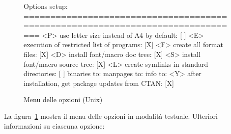 \documentclass{article}
\begin{document}
\begin{figure}[tbh]
\begin{boxedverbatim}
Options setup:
===============================================================================
 <P> use letter size instead of A4 by default: [ ]
 <E> execution of restricted list of programs: [X]
 <F> create all format files:                  [X]
 <D> install font/macro doc tree:              [X]
 <S> install font/macro source tree:           [X]
 <L> create symlinks in standard directories:  [ ]
            binaries to:
            manpages to:
                info to:
 <Y> after installation, get package updates from CTAN: [X]
\end{boxedverbatim}
\caption{Menu delle opzioni (Unix)}\label{fig:options-text}
\end{figure}

La figura~\ref{fig:options-text} mostra il menu delle opzioni in modalità
testuale. Ulteriori informazioni su ciascuna opzione:
\end{document}
